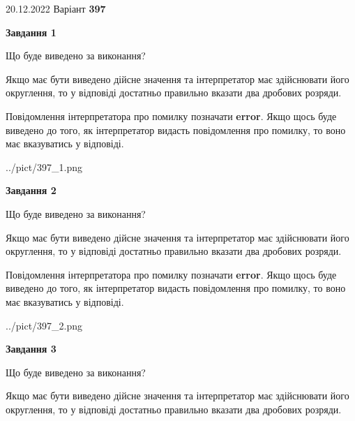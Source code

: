 \documentclass[12pt, ukrainian]{article}
\begin{document}
{20.12.2022 Варіант \No \textbf { 397 }\par}
{
\begin {Large}

{\begin {center}\textbf{Завдання 1}\end {center}}\par
Що буде виведено за виконання? \par

Якщо має бути виведено дійсне значення та інтерпретатор має здійснювати його округлення, 
то у відповіді достатньо правильно вказати два дробових розряди.

Повідомлення інтерпретатора про помилку позначати \textbf{error}.
Якщо щось буде виведено до того, як інтерпретатор видасть повідомлення про помилку, 
то воно має вказуватись у відповіді. \par

\begin{center}
	{../pict/397_1.png}
\end{center}
\newpage

{\begin {center}\textbf{Завдання 2}\end {center}}\par
Що буде виведено за виконання? \par

Якщо має бути виведено дійсне значення та інтерпретатор має здійснювати його округлення, 
то у відповіді достатньо правильно вказати два дробових розряди.

Повідомлення інтерпретатора про помилку позначати \textbf{error}.
Якщо щось буде виведено до того, як інтерпретатор видасть повідомлення про помилку, 
то воно має вказуватись у відповіді. \par

\begin{center}
	{../pict/397_2.png}
\end{center}
\newpage

{\begin {center}\textbf{Завдання 3}\end {center}}\par
Що буде виведено за виконання? \par

Якщо має бути виведено дійсне значення та інтерпретатор має здійснювати його округлення, 
то у відповіді достатньо правильно вказати два дробових розряди.


\end{Large}}
\end{document}
